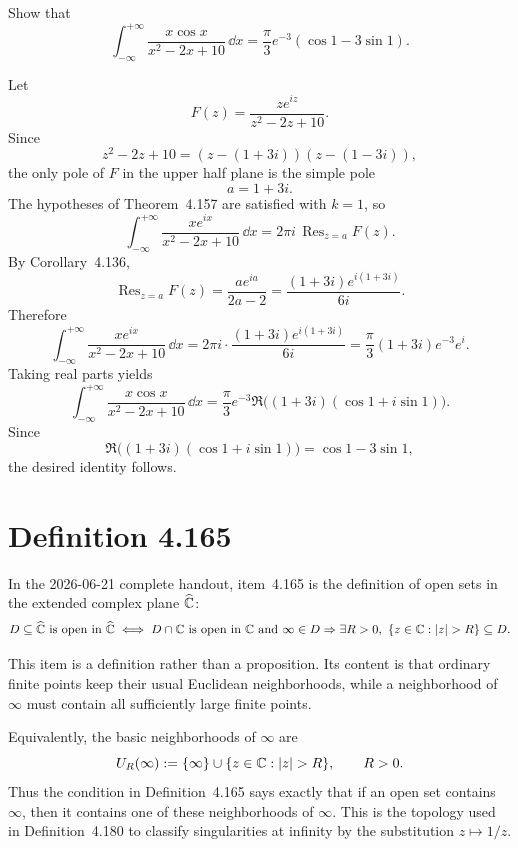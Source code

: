 \documentclass{article}
\newcommand{\Res}{\operatorname{Res}}
\newcommand{\Chat}{\widehat{\C}}
\begin{document}
Show that
\[
  \int_{-\infty}^{+\infty}
  \frac{x\cos x}{x^2-2x+10}\,\dd x
  =
  \frac{\pi}{3}e^{-3}(\cos 1-3\sin 1).
\]

\begin{solution}
  Let
  \[
    F(z)=\frac{z e^{iz}}{z^2-2z+10}.
  \]
  Since
  \[
    z^2-2z+10=(z-(1+3i))(z-(1-3i)),
  \]
  the only pole of $F$ in the upper half plane is the simple pole
  \[
    a=1+3i.
  \]
  The hypotheses of Theorem~4.157 are satisfied with $k=1$, so
  \[
    \int_{-\infty}^{+\infty}
    \frac{x e^{ix}}{x^2-2x+10}\,\dd x
    =
    2\pi i\,\Res_{z=a}F(z).
  \]
  By Corollary~4.136,
  \[
    \Res_{z=a}F(z)
    =
    \frac{a e^{ia}}{2a-2}
    =
    \frac{(1+3i)e^{i(1+3i)}}{6i}.
  \]
  Therefore
  \[
    \int_{-\infty}^{+\infty}
    \frac{x e^{ix}}{x^2-2x+10}\,\dd x
    =
    2\pi i\cdot
    \frac{(1+3i)e^{i(1+3i)}}{6i}
    =
    \frac{\pi}{3}(1+3i)e^{-3}e^{i}.
  \]
  Taking real parts yields
  \[
    \int_{-\infty}^{+\infty}
    \frac{x\cos x}{x^2-2x+10}\,\dd x
    =
    \frac{\pi}{3}e^{-3}
    \Re\bigl((1+3i)(\cos 1+i\sin 1)\bigr).
  \]
  Since
  \[
    \Re\bigl((1+3i)(\cos 1+i\sin 1)\bigr)
    =
    \cos 1-3\sin 1,
  \]
  the desired identity follows.
\end{solution}

\section{Definition 4.165}

In the 2026-06-21 complete handout, item~4.165 is the definition of open
sets in the extended complex plane $\Chat$:
\[
  D\subseteq \Chat \text{ is open in } \Chat
  \iff
  D\cap \C \text{ is open in } \C
  \text{ and }
  \infty\in D \Rightarrow
  \exists R>0,\ \{z\in\C:|z|>R\}\subseteq D.
\]

\begin{solution}
  This item is a definition rather than a proposition. Its content is that
  ordinary finite points keep their usual Euclidean neighborhoods, while a
  neighborhood of $\infty$ must contain all sufficiently large finite points.

  Equivalently, the basic neighborhoods of $\infty$ are
  \[
    U_R(\infty):=\{\infty\}\cup\{z\in\C:|z|>R\},
    \qquad R>0.
  \]
  Thus the condition in Definition~4.165 says exactly that if an open set
  contains $\infty$, then it contains one of these neighborhoods of $\infty$.
  This is the topology used in Definition~4.180 to classify singularities at
  infinity by the substitution $z\mapsto 1/z$.
\end{solution}
\end{document}
